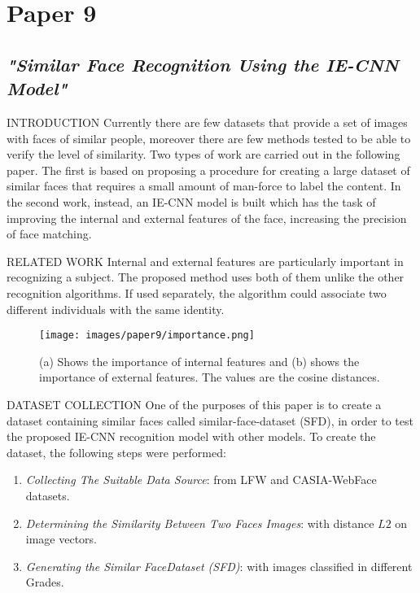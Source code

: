 \section{Paper 9}
\subsection{\emph{"Similar Face Recognition Using the IE-CNN Model"}}

\begin{frame}{INTRODUCTION}
    Currently there are few datasets that provide a set of images with faces of 
    similar people, moreover there are few methods tested to be able to verify 
    the level of similarity. Two types of work are carried out in the following paper. 
    The first is based on proposing a procedure for creating a large dataset of 
    similar faces that requires a small amount of man-force to label the content. 
    In the second work, instead, an IE-CNN model is built which has the task 
    of improving the internal and external features of the face, increasing the 
    precision of face matching.
\end{frame}

\begin{frame}{RELATED WORK}
    Internal and external features are particularly important in recognizing a 
    subject. The proposed method uses both of them unlike the other 
    recognition algorithms. If used separately, the algorithm could associate 
    two different individuals with the same identity.
    \begin{figure}[h!]
        \centering
        \texttt{[image: images/paper9/importance.png]}
        \centering
        \caption{(a) Shows the importance of internal features and (b) shows the importance of external features. The values are the cosine distances.}
        \label{fig:features}
    \end{figure} 
\end{frame}

\begin{frame}{DATASET COLLECTION}
    One of the purposes of this paper is to create a dataset containing similar 
    faces called similar-face-dataset (SFD), in order to test the proposed 
    IE-CNN recognition model with other models. To create the dataset, the 
    following steps were performed:
    \begin{enumerate}
        \item \emph{Collecting The Suitable Data Source}: from LFW and CASIA-WebFace datasets.
        \item \emph{Determining the Similarity Between Two Faces Images}: with distance $L2$ on image vectors.
        \item \emph{Generating the Similar FaceDataset (SFD)}: with images classified in different Grades.
    \end{enumerate}
\end{frame}

